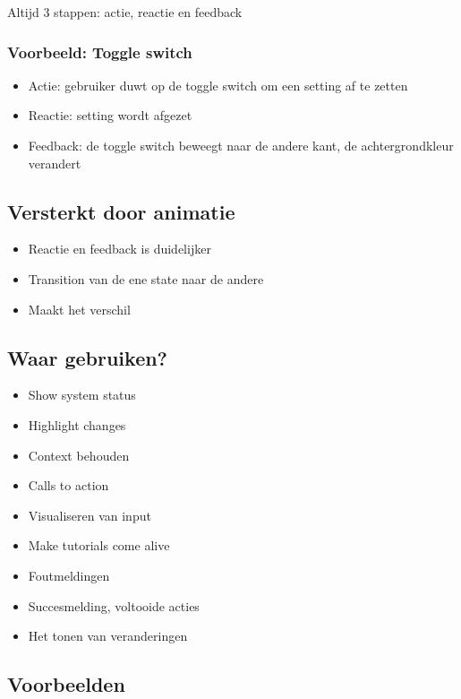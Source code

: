 \documentclass{article}
\begin{document}
Altijd 3 stappen: actie, reactie en feedback

\subsubsection{Voorbeeld: Toggle switch}

\begin{itemize}
    \item Actie: gebruiker duwt op de toggle switch om een setting af te zetten
    \item Reactie: setting wordt afgezet   
    \item Feedback: de toggle switch beweegt naar de andere kant, de achtergrondkleur verandert
\end{itemize}


\subsection{Versterkt door animatie}

\begin{itemize}
    \item Reactie en feedback is duidelijker
    \item Transition van de ene state naar de andere
    \item Maakt het verschil
\end{itemize}

\subsection{Waar gebruiken?}

\begin{itemize}
    \item Show system status
    \item Highlight changes
    \item Context behouden
    \item Calls to action
    \item Visualiseren van input
    \item Make tutorials come alive
    \item Foutmeldingen
    \item Succesmelding, voltooide acties
    \item Het tonen van veranderingen
\end{itemize}


\subsection{Voorbeelden}
\end{document}
